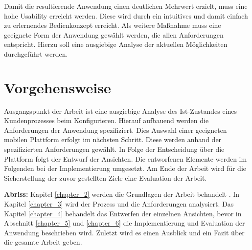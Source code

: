 Damit die resultierende Anwendung einen deutlichen Mehrwert erzielt, muss eine hohe Usability erreicht werden. Diese wird durch ein intuitives und damit einfach zu erlernendes Bedienkonzept erreicht. Als weitere Maßnahme muss eine geeignete Form der Anwendung gewählt werden, die allen Anforderungen entspricht. Hierzu soll eine ausgiebige Analyse der aktuellen Möglichkeiten durchgeführt werden.



\section{Vorgehensweise}
Ausgangspunkt der Arbeit ist eine ausgiebige Analyse des Ist-Zustandes eines Kundenprozesses beim Konfigurieren. Hierauf aufbauend werden die Anforderungen der Anwendung spezifiziert. Dies Auswahl einer geeigneten mobilen Plattform erfolgt im nächsten Schritt. Diese werden anhand der spezifizierten Anforderungen gewählt. In Folge der Entscheidung über die Plattform folgt der Entwurf der Ansichten. Die entworfenen Elemente werden im Folgenden bei der Implementierung umgesetzt. Am Ende der Arbeit wird für die Sicherstellung der zuvor gestellten Ziele eine Evaluation der Arbeit. 
\par
\textbf{Abriss: }
Kapitel \ref{chapter_2} werden die Grundlagen der Arbeit behandelt . In Kapitel \ref{chapter_3} wird der Prozess und die Anforderungen analysiert. Das Kapitel \ref{chapter_4} behandelt das Entwerfen der einzelnen Ansichten, bevor in Abschnitt \ref{chapter_5} und \ref{chapter_6} die Implementierung und Evaluation der Anwendung beschrieben wird. Zuletzt wird es einen Ausblick und ein Fazit über die gesamte Arbeit geben.







